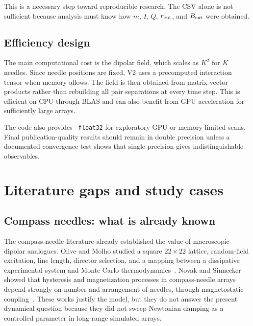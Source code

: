 \documentclass[11pt,a4paper]{article}
\newcommand{\code}[1]{\texttt{#1}}
\begin{document}
This is a necessary step toward reproducible research. The CSV alone is not sufficient because analysis must know how $m$, $I$, $Q$, $r_{\rm cut}$, and $B_{\rm ext}$ were obtained.

\subsection{Efficiency design}

The main computational cost is the dipolar field, which scales as $K^2$ for $K$ needles. Since needle positions are fixed, V2 uses a precomputed interaction tensor when memory allows. The field is then obtained from matrix-vector products rather than rebuilding all pair separations at every time step. This is efficient on CPU through BLAS and can also benefit from GPU acceleration for sufficiently large arrays.

The code also provides \code{--float32} for exploratory GPU or memory-limited scans. Final publication-quality results should remain in double precision unless a documented convergence test shows that single precision gives indistinguishable observables.

\section{Literature gaps and study cases}
\label{sec:gaps}

\subsection{Compass needles: what is already known}

The compass-needle literature already established the value of macroscopic dipolar analogues. Olive and Molho studied a square $22\times22$ lattice, random-field excitation, line length, director selection, and a mapping between a dissipative experimental system and Monte Carlo thermodynamics~\cite{olive1998}. Novak and Sinnecker showed that hysteresis and magnetization processes in compass-needle arrays depend strongly on number and arrangement of needles, through magnetostatic coupling~\cite{novak2004}. These works justify the model, but they do not answer the present dynamical question because they did not sweep Newtonian damping as a controlled parameter in long-range simulated arrays.
\end{document}
